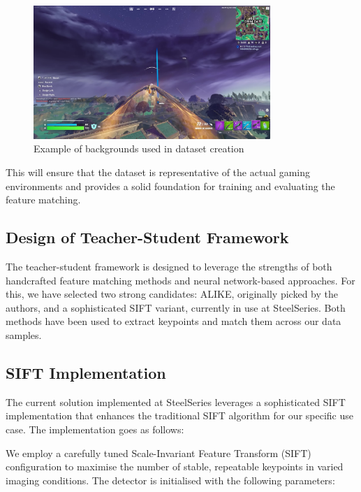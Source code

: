 \begin{figure}[H]
    \centering
    \includegraphics[width=0.8\textwidth]{ressources/bg_example.jpg}
    \caption{Example of backgrounds used in dataset creation}
    \label{fig:background_example}
\end{figure}

This will ensure that the dataset is representative of the actual gaming
environments and provides a solid foundation for training and evaluating the
feature matching.
\subsection{Design of Teacher-Student Framework}
The teacher-student framework is designed to leverage the strengths of both
handcrafted feature matching methods and neural network-based approaches. For
this, we have selected two strong candidates: ALIKE, originally picked by the
authors, and a sophisticated SIFT variant, currently in use at SteelSeries.
Both methods have been used to extract keypoints and match them across our data
samples.
\subsection{SIFT Implementation}
The current solution implemented at SteelSeries leverages a sophisticated SIFT
implementation that enhances the traditional SIFT algorithm for our specific
use case. The implementation goes as follows:

We employ a carefully tuned Scale-Invariant Feature Transform (SIFT) configuration to maximise the number of stable, repeatable keypoints in varied imaging conditions. The detector is initialised with the following parameters:

